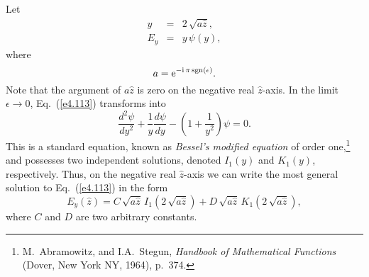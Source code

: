 Let 
\begin{eqnarray}
y &=& 2\,\sqrt{a\hat{z}},\\[0.5ex]
E_y &=& y\,\psi(y),
\end{eqnarray}
where
\begin{equation}
a = {\rm e}^{-{\rm i}\,\pi\,{\rm sgn}(\epsilon)}.
\end{equation}
Note that the argument of $a\hat{z}$ is zero on the negative real
$\hat{z}$-axis. 
In the limit $\epsilon\rightarrow 0$, Eq.~(\ref{e4.113}) transforms into
\begin{equation}
\frac{d^2\psi}{dy^2} + \frac{1}{y}\frac{d\psi}{dy} - \left(1+\frac{1}{y^2}\right)\!
\psi = 0.
\end{equation}
This is a standard equation, known as {\em Bessel's modified
equation}\/ of order one,\footnote{M.~Abramowitz, and I.A.~Stegun, {\em Handbook of Mathematical Functions}
(Dover, New York NY, 1964), p.~374.}
and possesses two independent solutions, denoted $I_1(y)$ and $K_1(y)$,
respectively. Thus, on the negative real $\hat{z}$-axis we can write
the most general solution to Eq.~(\ref{e4.113}) in the form
\begin{equation}\label{e4.121}
E_y(\hat{z}) = C\,\sqrt{a\hat{z}}\,I_1(2\,\sqrt{a\hat{z}}) + 
D\,\sqrt{a\hat{z}}\,K_1(2\,\sqrt{a\hat{z}}),
\end{equation}
where $C$ and $D$ are two arbitrary constants. 

